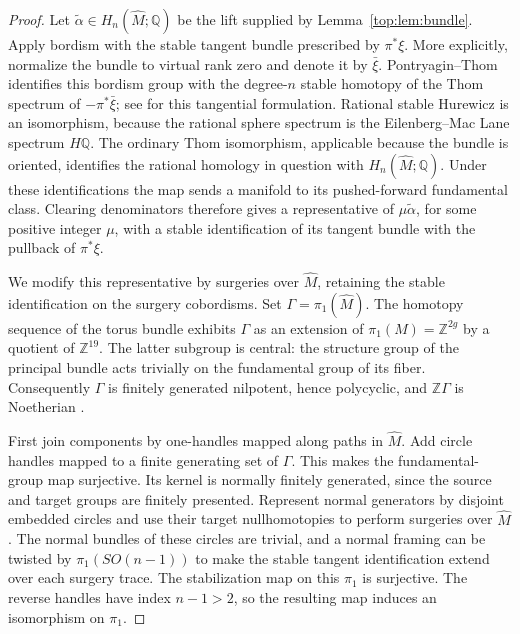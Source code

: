 \documentclass[11pt]{article}
\numberwithin{equation}{section}
\theoremstyle{definition}
\theoremstyle{remark}
\newcommand{\Q}{\mathbb Q}
\newcommand{\Z}{\mathbb Z}
\begin{document}
\begin{proof}
Let $\widetilde\alpha\in H_n(\widehat M;\Q)$ be the lift supplied by
Lemma~\ref{top:lem:bundle}.  Apply bordism with the stable tangent bundle
prescribed by $\pi^*\xi$.  More explicitly, normalize the bundle to
virtual rank zero and denote it by $\bar\xi$.  Pontryagin--Thom identifies
this bordism group with the degree-$n$ stable homotopy of the Thom spectrum
of $-\pi^*\bar\xi$; see \cite[Theorems~2.5--2.6]{Top:Rathel} for this
tangential formulation.  Rational stable Hurewicz is an isomorphism,
because the rational sphere spectrum is the Eilenberg--Mac Lane spectrum
$H\Q$.  The ordinary Thom isomorphism, applicable because the bundle is
oriented, identifies the rational homology in question with
$H_n(\widehat M;\Q)$.  Under these identifications the map sends a
manifold to its pushed-forward fundamental class.  Clearing denominators
therefore gives a representative of $\mu\widetilde\alpha$, for some
positive integer $\mu$, with a stable identification of its tangent
bundle with the pullback of $\pi^*\xi$.

We modify this representative by surgeries over $\widehat M$, retaining
the stable identification on the surgery cobordisms.  Set
$\Gamma=\pi_1(\widehat M)$.  The homotopy sequence of the torus bundle
exhibits $\Gamma$ as an extension of $\pi_1(M)=\Z^{2g}$ by a quotient
of $\Z^{19}$.  The latter subgroup is central: the structure group of
the principal bundle acts trivially on the fundamental group of its
fiber.  Consequently $\Gamma$ is finitely generated nilpotent, hence
polycyclic, and $\Z\Gamma$ is Noetherian \cite{Top:Hall}.

First join components by one-handles mapped along paths in
$\widehat M$.  Add circle handles mapped to a finite generating set of
$\Gamma$.  This makes the fundamental-group map surjective.  Its kernel
is normally finitely generated, since the source and target groups are
finitely presented.  Represent normal generators by disjoint embedded
circles and use their target nullhomotopies to perform surgeries over
$\widehat M$.  The normal bundles of these circles are trivial, and a
normal framing can be twisted by $\pi_1(SO(n-1))$ to make the stable
tangent identification extend over each surgery trace.  The stabilization
map on this $\pi_1$ is surjective.  The reverse handles have index
$n-1>2$, so the resulting map induces an isomorphism on $\pi_1$.


\end{proof}
\end{document}
